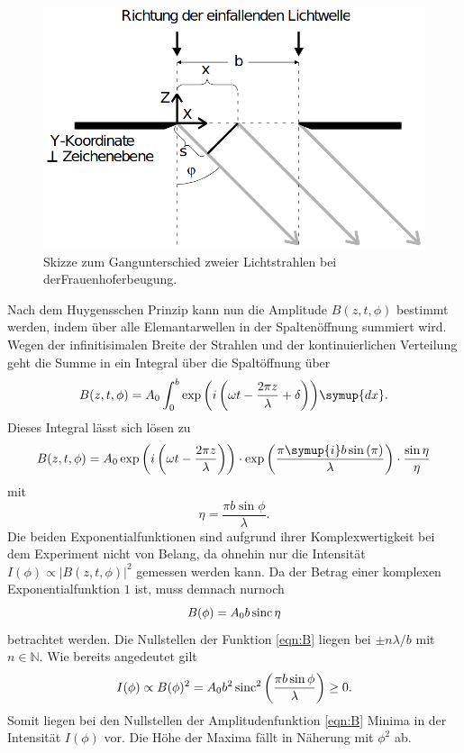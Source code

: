\begin{figure}[H]
    \centering
    \includegraphics[scale = 0.45]{pictures/frauenhofer2.png}
    \caption{Skizze zum Gangunterschied zweier Lichtstrahlen bei derFrauenhoferbeugung. \cite{AP01}}
    \label{fig:frauenhofer2}
\end{figure}

\noindent
Nach dem Huygensschen Prinzip kann nun die Amplitude $B(z,t,\phi)$ bestimmt werden, indem über alle Elemantarwellen 
in der Spaltenöffnung summiert wird. Wegen der infinitisimalen Breite der Strahlen und der kontinuierlichen Verteilung geht die Summe in ein 
Integral über die Spaltöffnung über
\begin{equation*}
    B(z,t,\phi)=A_0\int_0^b{\exp{\left(i\left(\omega t-\frac{2\pi z}{\lambda}+\delta\right)\right)}\symup{dx}}    .
\end{equation*}
Dieses Integral lässt sich lösen zu 
\begin{equation*}
    B(z,t,\phi) = A_0\exp{\left(i\left(\omega t-\frac{2 \pi z}{\lambda}\right)\right)}
                \cdot\exp{\left(\frac{\pi \symup{i} b \sin{(\pi)}}{\lambda}\right)}
                \cdot\frac{\sin{\eta}}{\eta}
\end{equation*}
mit
\begin{equation*}
    \eta=\frac{\pi b \sin{\phi}}{\lambda}   .
\end{equation*}
Die beiden Exponentialfunktionen sind aufgrund ihrer Komplexwertigkeit bei dem Experiment nicht von Belang, da ohnehin nur
die Intensität $I(\phi)\propto |B(z,t,\phi)|^2$ gemessen werden kann. Da der Betrag einer komplexen Exponentialfunktion $\num{1}$ ist, muss 
demnach nurnoch 
\begin{equation}
    B(\phi)=A_0b\operatorname{sinc}{\eta}
    \label{eqn:B}
\end{equation}
betrachtet werden. Die Nullstellen der Funktion \eqref{eqn:B} liegen bei $\pm n\lambda/b$ mit $n \in \mathbb{N}$.
Wie bereits angedeutet gilt 
\begin{equation}
    I(\phi)\propto B(\phi)^2=
    A_0b^2\operatorname{sinc}^2{\left(\frac{\pi b \sin{\phi}}{\lambda}\right)}
    \geq 0  .
    \label{eqn:intensität1}
\end{equation}
Somit liegen bei den Nullstellen der Amplitudenfunktion \ref{eqn:B} Minima in der Intensität $I(\phi)$ vor. Die Höhe der Maxima fällt in 
Näherung mit $\phi^2$ ab.   

